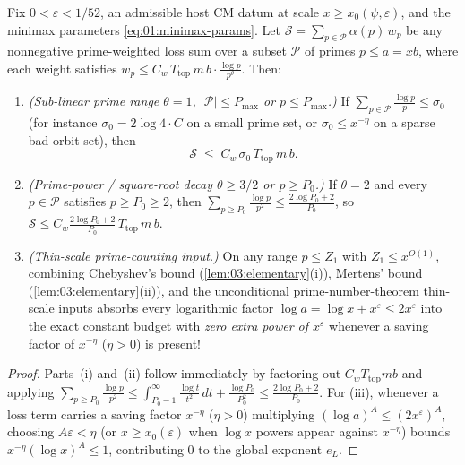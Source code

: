 \begin{lemma}
\label{lem:10:master-absorption}
Fix $0 < \varepsilon < 1/52$, an admissible host CM datum at scale $x \ge x_0(\psi, \varepsilon)$, and the minimax parameters \eqref{eq:01:minimax-params}. Let $\mathcal{S} = \sum_{p \in \mathcal{P}} \alpha(p)\, w_p$ be any nonnegative prime-weighted loss sum over a subset $\mathcal{P}$ of primes $p \le a = x b$, where each weight satisfies $w_p \le C_w\, T_{\mathrm{top}}\, m\, b \cdot \frac{\log p}{p^\theta}$. Then:
\begin{enumerate}[label=\textup{(\roman*)}]
\item \emph{(Sub-linear prime range $\theta = 1$, $|\mathcal{P}| \le P_{\max}$ or $p \le P_{\max}$.)} If $\sum_{p \in \mathcal{P}} \frac{\log p}{p} \le \sigma_0$ (for instance $\sigma_0 = 2\log 4 \cdot C$ on a small prime set, or $\sigma_0 \le x^{-\eta}$ on a sparse bad-orbit set), then
  \[
    \mathcal{S} \;\le\; C_w\,\sigma_0\, T_{\mathrm{top}}\, m\, b.
  \]
\item \emph{(Prime-power / square-root decay $\theta \ge 3/2$ or $p \ge P_0$.)} If $\theta = 2$ and every $p \in \mathcal{P}$ satisfies $p \ge P_0 \ge 2$, then $\sum_{p \ge P_0} \frac{\log p}{p^2} \le \frac{2\log P_0 + 2}{P_0}$, so $\mathcal{S} \le C_w \frac{2\log P_0 + 2}{P_0}\, T_{\mathrm{top}}\, m\, b$.
\item \emph{(Thin-scale prime-counting input.)} On any range $p \le Z_1$ with $Z_1 \le x^{O(1)}$, combining Chebyshev's bound (\cref{lem:03:elementary}(i)), Mertens' bound (\cref{lem:03:elementary}(ii)), and the unconditional prime-number-theorem thin-scale inputs absorbs every logarithmic factor $\log a = \log x + x^\varepsilon \le 2 x^\varepsilon$ into the exact constant budget with \emph{zero extra power of $x^\varepsilon$} whenever a saving factor of $x^{-\eta}$ ($\eta > 0$) is present!
\end{enumerate}
\end{lemma}

\begin{proof}
Parts~(i) and~(ii) follow immediately by factoring out $C_w T_{\mathrm{top}} m b$ and applying $\sum_{p \ge P_0} \frac{\log p}{p^2} \le \int_{P_0 - 1}^\infty \frac{\log t}{t^2}\,dt + \frac{\log P_0}{P_0^2} \le \frac{2\log P_0 + 2}{P_0}$. For (iii), whenever a loss term carries a saving factor $x^{-\eta}$ ($\eta > 0$) multiplying $(\log a)^A \le (2 x^\varepsilon)^A$, choosing $A \varepsilon < \eta$ (or $x \ge x_0(\varepsilon)$ when $\log x$ powers appear against $x^{-\eta}$) bounds $x^{-\eta} (\log x)^A \le 1$, contributing $0$ to the global exponent $e_L$.
\end{proof}

